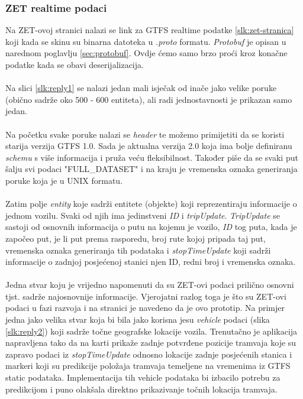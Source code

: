 \documentclass[zavrsnirad]{fer}
\begin{document}
\subsubsection{ZET realtime podaci}
Na ZET-ovoj stranici nalazi se link za GTFS realtime podatke \ref{slk:zet-stranica} koji kada se skinu su binarna datoteka u \textit{.proto} formatu. \textit{Protobuf} je opisan u narednom poglavlju \ref{sec:protobuf}. Ovdje ćemo samo brzo proći kroz konačne podatke kada se obavi deserijalizacija.\\\\
Na slici \ref{slk:reply1} se nalazi jedan mali isječak od inače jako velike poruke (obično sadrže oko 500 - 600 entiteta), ali radi jednostavnosti je prikazan samo jedan.\\\\
Na početku svake poruke nalazi se \textit{header} te možemo primijetiti da se koristi starija verzija GTFS 1.0. Sada je aktualna verzija 2.0 koja ima bolje definiranu \textit{schemu} s više informacija i pruža veću fleksibilnost. Također piše da se svaki put šalju svi podaci "FULL\_DATASET" i na kraju je vremenska oznaka generiranja poruke koja je u UNIX formatu.\\\\
Zatim polje \textit{entity} koje sadrži entitete (objekte) koji reprezentiraju informacije o jednom vozilu. Svaki od njih ima jedinstveni \textit{ID} i \textit{tripUpdate}. \textit{TripUpdate} se sastoji od osnovnih informacija o putu na kojemu je vozilo, \textit{ID} tog puta, kada je započeo put, je li put prema rasporedu, broj rute kojoj pripada taj put, vremenska oznaka generiranja tih podataka i \textit{stopTimeUpdate} koji sadrži informacije o zadnjoj posjećenoj stanici njen ID, redni broj i vremenska oznaka.\\\\
Jedna stvar koju je vrijedno napomenuti da su ZET-ovi podaci prilično osnovni tjst. sadrže najosnovnije informacije. Vjerojatni razlog toga je što su ZET-ovi podaci u fazi razvoja i na stranici je navedeno da je ovo prototip. Na primjer jedna jako velika stvar koja bi bila jako korisna jesu \textit{vehicle} podaci (slika \ref{slk:reply2}) koji sadrže točne geografske lokacije vozila. Trenutačno je aplikacija napravljena tako da na karti prikaže zadnje potvrđene pozicije tramvaja koje su zapravo podaci iz \textit{stopTimeUpdate} odnosno lokacije zadnje posjećenih stanica i markeri koji su predikcije položaja tramvaja temeljene na vremenima iz GTFS static podataka. Implementacija tih vehicle podataka bi izbacilo potrebu za predikcijom i puno olakšala direktno prikazivanje točnih lokacija tramvaja.
\end{document}
